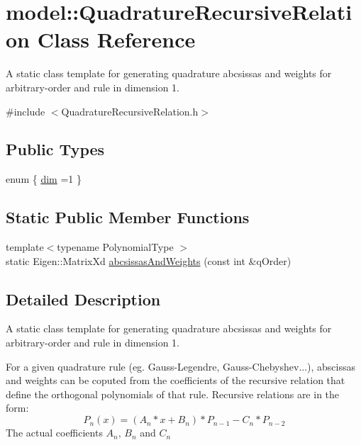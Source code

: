 \hypertarget{classmodel_1_1_quadrature_recursive_relation}{}\section{model\+:\+:Quadrature\+Recursive\+Relation Class Reference}
\label{classmodel_1_1_quadrature_recursive_relation}


A static class template for generating quadrature abcsissas and weights for arbitrary-\/order and rule in dimension 1.  




{\ttfamily \#include $<$Quadrature\+Recursive\+Relation.\+h$>$}

\subsection*{Public Types}
\begin{DoxyCompactItemize}
\item 
enum \{ \hyperlink{classmodel_1_1_quadrature_recursive_relation_a92659c45357d429ddfab7687b7392128a6e3c7acbeebe1261e0fd1f737a639a10}{dim} =1
 \}
\end{DoxyCompactItemize}
\subsection*{Static Public Member Functions}
\begin{DoxyCompactItemize}
\item 
{\footnotesize template$<$typename Polynomial\+Type $>$ }\\static Eigen\+::\+Matrix\+Xd \hyperlink{classmodel_1_1_quadrature_recursive_relation_a6f3bb9995de139df0a624ab11b357076}{abcsissas\+And\+Weights} (const int \&q\+Order)
\end{DoxyCompactItemize}


\subsection{Detailed Description}
A static class template for generating quadrature abcsissas and weights for arbitrary-\/order and rule in dimension 1. 

For a given quadrature rule (eg. Gauss-\/\+Legendre, Gauss-\/\+Chebyshev...), abscissas and weights can be coputed from the coefficients of the recursive relation that define the orthogonal polynomials of that rule. Recursive relations are in the form\+: \[ P_n(x) = (A_n*x+B_n) * P_{n-1} - C_n * P_{n-2} \] The actual coefficients $A_n$, $B_n$ and $C_n$

